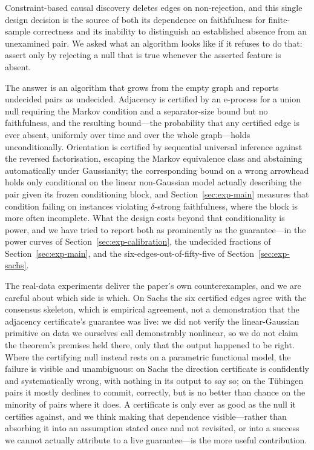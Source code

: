\documentclass[pdflatex,sn-apa]{sn-jnl}
\theoremstyle{thmstyleone}%
\theoremstyle{thmstyletwo}%
\theoremstyle{thmstylethree}%
\begin{document}
Constraint-based causal discovery deletes edges on non-rejection, and this
single design decision is the source of both its dependence on faithfulness
for finite-sample correctness and its inability to distinguish an established
absence from an unexamined pair. We asked what an algorithm looks like if it
refuses to do that: assert only by rejecting a null that is true whenever the
asserted feature is absent.

The answer is an algorithm that grows from the empty graph and reports
undecided pairs as undecided. Adjacency is certified by an e-process for a
union null requiring the Markov condition and a separator-size bound but no
faithfulness, and the resulting bound---the probability that any certified
edge is ever absent, uniformly over time and over the whole graph---holds
unconditionally. Orientation is certified by sequential universal inference
against the reversed factorisation, escaping the Markov equivalence class and
abstaining automatically under Gaussianity; the corresponding bound on a
wrong arrowhead holds only conditional on the linear non-Gaussian model
actually describing the pair given its frozen conditioning block, and
Section~\ref{sec:exp-main} measures that condition failing on instances
violating $\delta$-strong faithfulness, where the block is more often
incomplete. What the design costs beyond that conditionality is power, and we
have tried to report both as prominently as the guarantee---in the power
curves of Section~\ref{sec:exp-calibration}, the undecided fractions of
Section~\ref{sec:exp-main}, and the six-edges-out-of-fifty-five of
Section~\ref{sec:exp-sachs}.

The real-data experiments deliver the paper's own counterexamples, and we are
careful about which side is which. On Sachs the six certified edges agree
with the consensus skeleton, which is empirical agreement, not a
demonstration that the adjacency certificate's guarantee was live: we did not
verify the linear-Gaussian primitive on data we ourselves call demonstrably
nonlinear, so we do not claim the theorem's premises held there, only that
the output happened to be right. Where the certifying null instead rests on
a parametric functional model, the failure is visible and unambiguous: on
Sachs the direction certificate is confidently and systematically wrong,
with nothing in its output to say so; on the Tübingen pairs it mostly
declines to commit, correctly, but is no better than chance on the minority
of pairs where it does. A certificate is only ever as good as the null it
certifies against, and we think making that dependence visible---rather than
absorbing it into an assumption stated once and not revisited, or into a
success we cannot actually attribute to a live guarantee---is the more
useful contribution.
\end{document}
